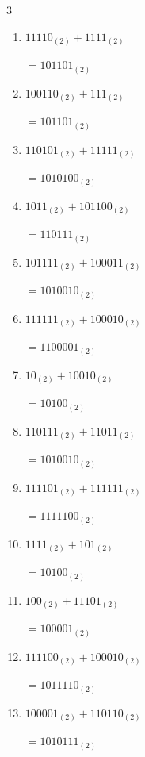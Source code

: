 \begin{multicols}{3}
\begin{enumerate}
        $=1101101_{(2)}$

  \item $11110_{(2)} + 1111_{(2)}$

        $=101101_{(2)}$

\columnbreak %

\resetques

  \item $100110_{(2)} + 111_{(2)}$

        $=101101_{(2)}$

  \item $110101_{(2)} + 11111_{(2)}$

        $=1010100_{(2)}$

  \item $1011_{(2)} + 101100_{(2)}$

        $=110111_{(2)}$

  \item $101111_{(2)} + 100011_{(2)}$

        $=1010010_{(2)}$

  \item $111111_{(2)} + 100010_{(2)}$

        $=1100001_{(2)}$

  \item $10_{(2)} + 10010_{(2)}$

        $=10100_{(2)}$

  \item $110111_{(2)} + 11011_{(2)}$

        $=1010010_{(2)}$

  \item $111101_{(2)} + 111111_{(2)}$

        $=1111100_{(2)}$

  \item $1111_{(2)} + 101_{(2)}$

        $=10100_{(2)}$

  \item $100_{(2)} + 11101_{(2)}$

        $=100001_{(2)}$

\columnbreak %

  \item $111100_{(2)} + 100010_{(2)}$

        $=1011110_{(2)}$

  \item $100001_{(2)} + 110110_{(2)}$

        $=1010111_{(2)}$


\end{enumerate}
\end{multicols}
